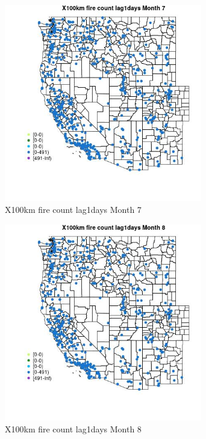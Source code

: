 \begin{figure} 
\centering  
\includegraphics[width=0.77\textwidth]{Code_Outputs/Report_ML_input_PM25_Step4_part_e_de_duplicated_aves_compiled_2019-05-14wNAs_MapObsMo7X100km_fire_count_lag1days.jpg} 
\caption{\label{fig:Report_ML_input_PM25_Step4_part_e_de_duplicated_aves_compiled_2019-05-14wNAsMapObsMo7X100km_fire_count_lag1days}X100km fire count lag1days Month 7} 
\end{figure} 
 

\begin{figure} 
\centering  
\includegraphics[width=0.77\textwidth]{Code_Outputs/Report_ML_input_PM25_Step4_part_e_de_duplicated_aves_compiled_2019-05-14wNAs_MapObsMo8X100km_fire_count_lag1days.jpg} 
\caption{\label{fig:Report_ML_input_PM25_Step4_part_e_de_duplicated_aves_compiled_2019-05-14wNAsMapObsMo8X100km_fire_count_lag1days}X100km fire count lag1days Month 8} 
\end{figure} 
 

